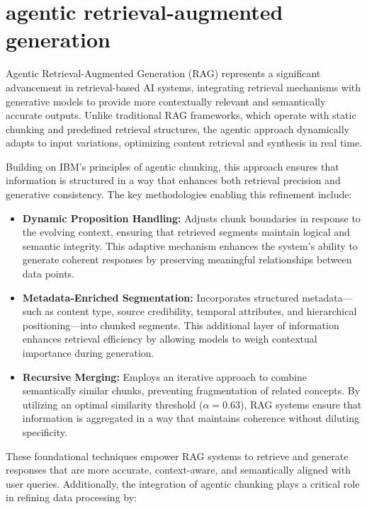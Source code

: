 \documentclass[conference]{IEEEtran}
\begin{document}
\section{agentic retrieval-augmented generation}

Agentic Retrieval-Augmented Generation (RAG) represents a significant advancement in retrieval-based AI systems, integrating retrieval mechanisms with generative models to provide more contextually relevant and semantically accurate outputs. Unlike traditional RAG frameworks, which operate with static chunking and predefined retrieval structures, the agentic approach dynamically adapts to input variations, optimizing content retrieval and synthesis in real time.  

Building on IBM’s principles of agentic chunking, this approach ensures that information is structured in a way that enhances both retrieval precision and generative consistency. The key methodologies enabling this refinement include:

\begin{itemize}
    \item \textbf{Dynamic Proposition Handling:} Adjusts chunk boundaries in response to the evolving context, ensuring that retrieved segments maintain logical and semantic integrity. This adaptive mechanism enhances the system’s ability to generate coherent responses by preserving meaningful relationships between data points. \cite{12}
    \item \textbf{Metadata-Enriched Segmentation:} Incorporates structured metadata—such as content type, source credibility, temporal attributes, and hierarchical positioning—into chunked segments. This additional layer of information enhances retrieval efficiency by allowing models to weigh contextual importance during generation. \cite{4}
    \item \textbf{Recursive Merging:} Employs an iterative approach to combine semantically similar chunks, preventing fragmentation of related concepts. By utilizing an optimal similarity threshold ($\alpha=0.63$), RAG systems ensure that information is aggregated in a way that maintains coherence without diluting specificity. \cite{13}
\end{itemize}

These foundational techniques empower RAG systems to retrieve and generate responses that are more accurate, context-aware, and semantically aligned with user queries. Additionally, the integration of agentic chunking plays a critical role in refining data processing by:
\end{document}
